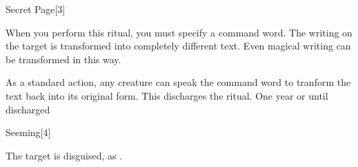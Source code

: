 \begin{spellsection}{Secret Page}[3]
    \begin{spellheader}
    \end{spellheader}
    \begin{spellcontent}
        \begin{spelltargetinginfo}
        \end{spelltargetinginfo}
        \begin{spelleffects}

            \spellspecial When you perform this ritual, you must specify a command word.
            \spellline
            \spelleffect The writing on the target is transformed into completely different text. Even magical writing can be transformed in this way.

            As a standard action, any creature can speak the command word to tranform the text back into its original form. This discharges the ritual.
            \spelldur One year or until discharged
        \end{spelleffects}
    \end{spellcontent}
    \begin{spellfooter}
    \end{spellfooter}
\end{spellsection}

\begin{spellsection}{Seeming}[4]
    \begin{spellheader}
    \end{spellheader}
    \begin{spellcontent}
        \begin{spelltargetinginfo}
        \end{spelltargetinginfo}
        \begin{spelleffects}

            \spelleffect The target is disguised, as .
            \spelldur \durlong \dismissable
        \end{spelleffects}
    \end{spellcontent}
    \begin{spellfooter}
    \end{spellfooter}
\end{spellsection}

